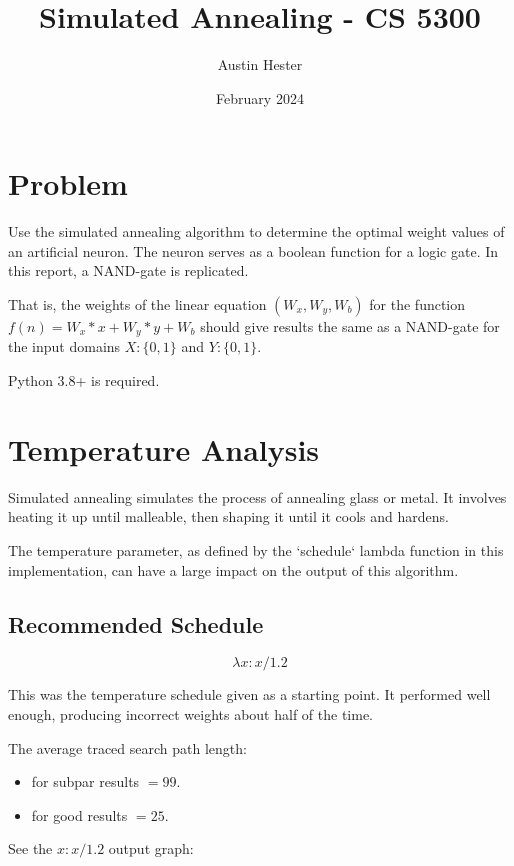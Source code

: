 \documentclass{article}
\title{Simulated Annealing - CS 5300}
\author{Austin Hester}
\date{February 2024}
\begin{document}
\maketitle

\section{Problem}

Use the simulated annealing algorithm to determine the optimal weight values of an artificial neuron.
The neuron serves as a boolean function for a logic gate. In this report, a NAND-gate is replicated.

That is, the weights of the linear equation $(W_x, W_y, W_b)$ for the 
function $f(n) = W_x*x + W_y*y + W_b$ should give results the same as a 
NAND-gate for the input domains $X : \{0, 1\}$ and $ Y : \{0, 1\}$.

Python 3.8+ is required.

\section{Temperature Analysis}

Simulated annealing simulates the process of annealing glass or metal.
It involves heating it up until malleable, then shaping it until it cools and hardens.

The temperature parameter, as defined by the `schedule` lambda function in this implementation, 
can have a large impact on the output of this algorithm.

\subsection{Recommended Schedule}

$$\lambda x : x / 1.2$$

This was the temperature schedule given as a starting point.
It performed well enough, producing incorrect weights about half of the time.

The average traced search path length:

\begin{itemize}
    \item for subpar results $= 99$.
    \item for good results $= 25$.
\end{itemize}

See the $x : x / 1.2$ output graph:
\end{document}
